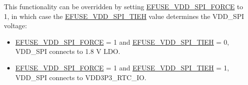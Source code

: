 \documentclass[main\_\_EN.tex]{subfiles}
\begin{document}
This functionality can be overridden by setting \hyperref[fielddesc:EFUSEVDDSPIFORCE]{EFUSE\_VDD\_SPI\_FORCE} to 1, in which case the \hyperref[fielddesc:EFUSEVDDSPITIEH]{EFUSE\_VDD\_SPI\_TIEH} value determines the VDD\_SPI voltage:

\begin{itemize}
    \item \hyperref[fielddesc:EFUSEVDDSPIFORCE]{EFUSE\_VDD\_SPI\_FORCE} = 1 and \hyperref[fielddesc:EFUSEVDDSPITIEH]{EFUSE\_VDD\_SPI\_TIEH} = 0, VDD\_SPI connects to 1.8 V LDO.
    \item \hyperref[fielddesc:EFUSEVDDSPIFORCE]{EFUSE\_VDD\_SPI\_FORCE} = 1 and \hyperref[fielddesc:EFUSEVDDSPITIEH]{EFUSE\_VDD\_SPI\_TIEH} = 1, VDD\_SPI connects to VDD3P3\_RTC\_IO.
\end{itemize}
\end{document}
